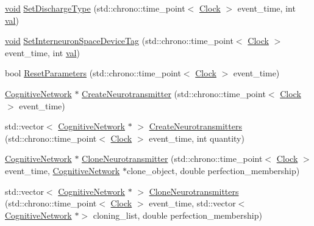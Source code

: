 \begin{DoxyCompactItemize}
\mbox{\hyperlink{glad_8h_a950fc91edb4504f62f1c577bf4727c29}{void}} \mbox{\hyperlink{class_interneuron_space_a7fc404aae98d45ccad26b5c186fab6e2}{Set\+Discharge\+Type}} (std\+::chrono\+::time\+\_\+point$<$ \mbox{\hyperlink{universe_8h_a0ef8d951d1ca5ab3cfaf7ab4c7a6fd80}{Clock}} $>$ event\+\_\+time, int \mbox{\hyperlink{glad_8h_a26942fd2ed566ef553eae82d2c109c8f}{val}})
\item 
\mbox{\hyperlink{glad_8h_a950fc91edb4504f62f1c577bf4727c29}{void}} \mbox{\hyperlink{class_interneuron_space_ab34d72ef9135288690328217d7c0a388}{Set\+Interneuron\+Space\+Device\+Tag}} (std\+::chrono\+::time\+\_\+point$<$ \mbox{\hyperlink{universe_8h_a0ef8d951d1ca5ab3cfaf7ab4c7a6fd80}{Clock}} $>$ event\+\_\+time, int \mbox{\hyperlink{glad_8h_a26942fd2ed566ef553eae82d2c109c8f}{val}})
\item 
bool \mbox{\hyperlink{class_interneuron_space_a3a9776e4a77b87374204468ca7974157}{Reset\+Parameters}} (std\+::chrono\+::time\+\_\+point$<$ \mbox{\hyperlink{universe_8h_a0ef8d951d1ca5ab3cfaf7ab4c7a6fd80}{Clock}} $>$ event\+\_\+time)
\item 
\mbox{\hyperlink{class_cognitive_network}{Cognitive\+Network}} $\ast$ \mbox{\hyperlink{class_interneuron_space_a26d98a0ae78ce363ab93e92cf0c973e7}{Create\+Neurotransmitter}} (std\+::chrono\+::time\+\_\+point$<$ \mbox{\hyperlink{universe_8h_a0ef8d951d1ca5ab3cfaf7ab4c7a6fd80}{Clock}} $>$ event\+\_\+time)
\item 
std\+::vector$<$ \mbox{\hyperlink{class_cognitive_network}{Cognitive\+Network}} $\ast$ $>$ \mbox{\hyperlink{class_interneuron_space_af69f7190226d77a30a80d66d7c28e0ba}{Create\+Neurotransmitters}} (std\+::chrono\+::time\+\_\+point$<$ \mbox{\hyperlink{universe_8h_a0ef8d951d1ca5ab3cfaf7ab4c7a6fd80}{Clock}} $>$ event\+\_\+time, int quantity)
\item 
\mbox{\hyperlink{class_cognitive_network}{Cognitive\+Network}} $\ast$ \mbox{\hyperlink{class_interneuron_space_a96149bba4c6efd03586700a6fe86960a}{Clone\+Neurotransmitter}} (std\+::chrono\+::time\+\_\+point$<$ \mbox{\hyperlink{universe_8h_a0ef8d951d1ca5ab3cfaf7ab4c7a6fd80}{Clock}} $>$ event\+\_\+time, \mbox{\hyperlink{class_cognitive_network}{Cognitive\+Network}} $\ast$clone\+\_\+object, double perfection\+\_\+membership)
\item 
std\+::vector$<$ \mbox{\hyperlink{class_cognitive_network}{Cognitive\+Network}} $\ast$ $>$ \mbox{\hyperlink{class_interneuron_space_a3defddf17eb839dbd799980f6116f895}{Clone\+Neurotransmitters}} (std\+::chrono\+::time\+\_\+point$<$ \mbox{\hyperlink{universe_8h_a0ef8d951d1ca5ab3cfaf7ab4c7a6fd80}{Clock}} $>$ event\+\_\+time, std\+::vector$<$ \mbox{\hyperlink{class_cognitive_network}{Cognitive\+Network}} $\ast$$>$ cloning\+\_\+list, double perfection\+\_\+membership)
$$
\end{DoxyCompactItemize}
